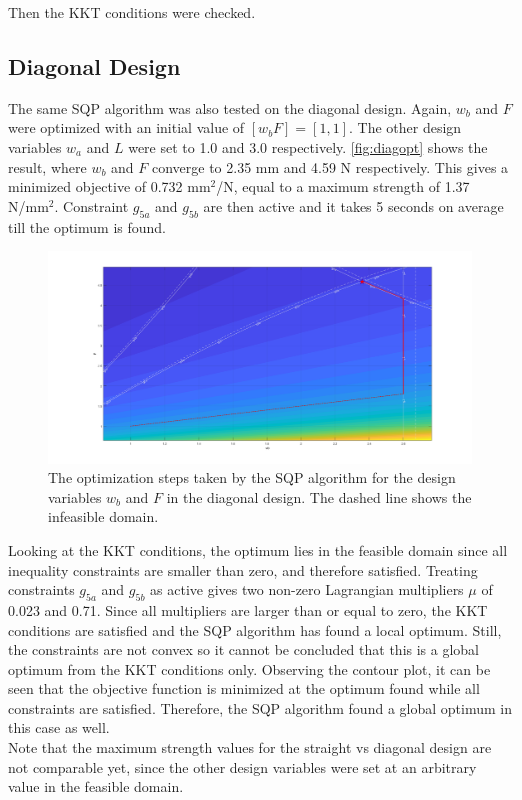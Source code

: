 Then the KKT conditions were checked. 
\subsection{Diagonal Design}
The same SQP algorithm was also tested on the diagonal design. Again, $w_b$ and $F$ were optimized with an initial value of $[w_b F] = [1, 1]$. The other design variables $w_a$ and $L$ were set to 1.0 and 3.0 respectively. \autoref{fig:diagopt} shows the result, where $w_b$ and $F$ converge to 2.35 mm and 4.59 N respectively. This gives a minimized objective of 0.732 mm$^2$/N, equal to a maximum strength of 1.37 N/mm$^2$. Constraint $g_{5a}$ and $g_{5b}$ are then active and it takes 5 seconds on average till the optimum is found.


\begin{figure}[H]
	\centering
	\includegraphics[width=\columnwidth]{sources/plots/diagonal2var.png}
	\caption{The optimization steps taken by the SQP algorithm for the design variables $w_b$ and $F$ in the diagonal design. The dashed line shows the infeasible domain.}
	\label{fig:diagopt}
\end{figure}

Looking at the KKT conditions, the optimum lies in the feasible domain since all inequality constraints are smaller than zero, and therefore satisfied. Treating constraints $g_{5a}$ and $g_{5b}$ as active gives two non-zero Lagrangian multipliers $\mu$ of 0.023 and 0.71. Since all multipliers are larger than or equal to zero, the KKT conditions are satisfied and the SQP algorithm has found a local optimum. Still, the constraints are not convex so it cannot be concluded that this is a global optimum from the KKT conditions only. Observing the contour plot, it can be seen that the objective function is minimized at the optimum found while all constraints are satisfied. Therefore, the SQP algorithm found a global optimum in this case as well.\\

Note that the maximum strength values for the straight vs diagonal design are not comparable yet, since the other design variables were set at an arbitrary value in the feasible domain.








